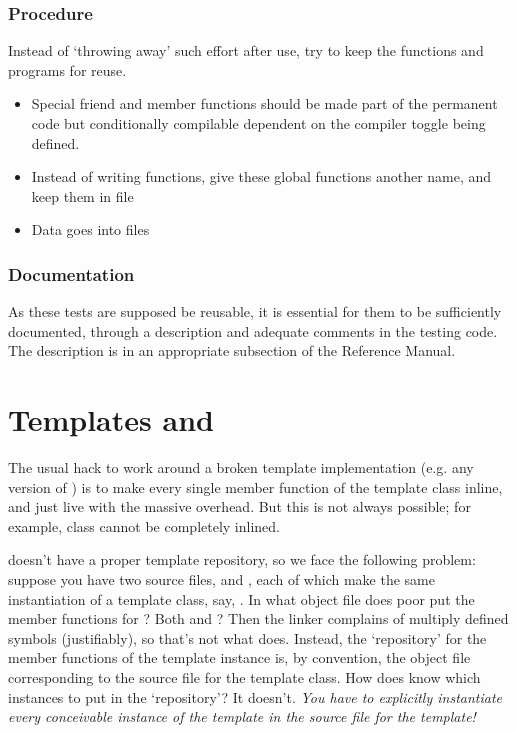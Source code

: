 \subsubsection{Procedure}

Instead of `throwing away' such effort after use,
try to keep the functions and programs for reuse.

\begin{itemize}
\item
Special friend and member
functions should be made part of the permanent code but
conditionally compilable
dependent on the compiler toggle  being defined.

\item
Instead of writing  functions, give these global
functions another name, and keep them in file

\item
Data goes into files

\end{itemize}

\subsubsection{Documentation}

As these tests are supposed be reusable, it is essential for them to
be sufficiently documented, through a description and adequate
comments in the testing code.  The description is in an appropriate
subsection of the Reference Manual.





\section{Templates and }

The usual hack to work around a broken template implementation (e.g.
any version of ) is to make every single member function of
the template class inline, and just live with the massive overhead.
But this is not always possible; for example, class 
cannot be completely inlined.

 doesn't have a proper template repository, so we face
the following problem: suppose you have two source files, 
and , each of which make the same instantiation of a
template class, say, . In what object file does poor
 put the member functions for ? Both
 and ? Then the linker complains of multiply
defined symbols (justifiably), so that's not what  does. Instead,
the `repository' for the member functions of the template instance is,
by convention, the object file corresponding to the source file for
the template class. How does  know which instances to put in
the `repository'? It doesn't. {\em You have to explicitly instantiate
every conceivable instance of the template in the source file for the
template!}

